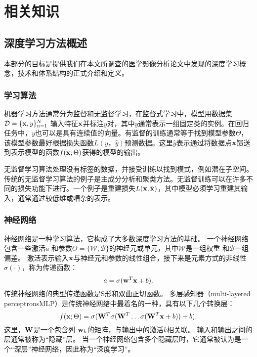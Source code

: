 \chapter{相关知识}
\label{chap:basicknowledge}
 
\section{深度学习方法概述}
\label{sec:neuralnets}
本部分的目标是提供我们在本文所调查的医学影像分析论文中发现的深度学习概念，技术和体系结构的正式介绍和定义。

\subsection{学习算法}

机器学习方法通​​常分为监督和无监督学习，在监督式学习中，模型用数据集$\mathcal{D} = \{{\bf x}, y\}^{N}_{n = 1}$ 输入特征${\bf x} $并标注$y$对，其中$y$通常表示一组固定类的实例。在回归任务中，$y$也可以是具有连续值的向量。有监督的训练通常等于找到模型参数$\Theta$，该模型参数最好根据损失函数$L(y，\hat{y})$预测数据。这里$\hat{y}$表示通过将数据点${\bf x}$馈送到表示模型的函数$f({\bf x}; \Theta)$获得的模型的输出。

无监督学习算法处理没有标签的数据，并接受训练以找到模式，例如潜在子空间。传统的无监督学习算法的例子是主成分分析和聚类方法。无监督训练可以在许多不同的损失功能下进行。一个例子是重建损失$L({\bf x}, \hat{{\bf x}})$，其中模型必须学习重建其输入，通常通过较低维或嘈杂的表示。

\subsection{神经网络}
神经网络是一种学习算法，它构成了大多数深度学习方法的基础。 一个神经网络包含一些激活$a$ 和参数$\Theta = \{\mathcal{W}, \mathcal{B}\}$的神经元或单元，其中$\mathcal{W}$是一组权重 和$\mathcal{B}$一组偏差。 激活表示输入${\bf x}$与神经元和参数的线性组合，接下来是元素方式的非线性$\sigma(\cdot)$，称为传递函数： 
\begin{equation}
 a = \sigma({\bf w}^{T}{\bf x} + b).
\end{equation}
传统神经网络的典型传递函数是S形和双曲正切函数。 多层感知器（multi-layered perceptronsMLP）是传统神经网络中最着名的一种，具有以下几个转换层：
 \begin{equation}
 	f({\bf x}; \Theta) = \sigma( {\bf W}^{T}\sigma({\bf W}^{T} \ldots \sigma({\bf W}^{T} {\bf x} + b)  ) + b).
 \end{equation}
 这里，${\bf W}$是一个包含列 ${\bf w}_{k}$的矩阵，与输出中的激活$k$相关联。 输入和输出之间的层通常被称为“隐藏”层。 当一个神经网络包含多个隐藏层时，它通常被认为是一个“深层”神经网络，因此称为“深度学习”。

